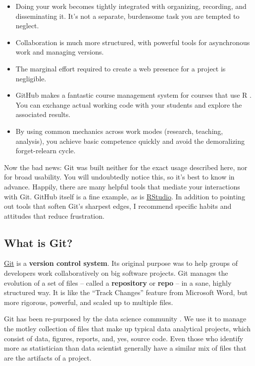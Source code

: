\documentclass[12pt]{article}
\providecommand{\tightlist}{%
  \setlength{\itemsep}{0pt}\setlength{\parskip}{0pt}}
\begin{document}
\begin{itemize}
\tightlist
\item
  Doing your work becomes tightly integrated with organizing, recording,
  and disseminating it. It's not a separate, burdensome task you are
  tempted to neglect.
\item
  Collaboration is much more structured, with powerful tools for
  asynchronous work and managing versions.
\item
  The marginal effort required to create a web presence for a project is
  negligible.
\item
  GitHub makes a fantastic course management system for courses that use
  R \citep{R}. You can exchange actual working code with your students
  and explore the associated results.
\item
  By using common mechanics across work modes (research, teaching,
  analysis), you achieve basic competence quickly and avoid the
  demoralizing forget-relearn cycle.
\end{itemize}

Now the bad news: Git was built neither for the exact usage described
here, nor for broad usability. You will undoubtedly notice this, so it's
best to know in advance. Happily, there are many helpful tools that
mediate your interactions with Git. GitHub itself is a fine example, as
is \href{https://www.rstudio.com/products/rstudio/}{RStudio}. In
addition to pointing out tools that soften Git's sharpest edges, I
recommend specific habits and attitudes that reduce frustration.

\subsection{What is Git?}\label{what-is-git}

\href{http://git-scm.com}{Git} is a \textbf{version control system}. Its
original purpose was to help groups of developers work collaboratively
on big software projects. Git manages the evolution of a set of files --
called a \textbf{repository} or \textbf{repo} -- in a sane, highly
structured way. It is like the ``Track Changes'' feature from Microsoft
Word, but more rigorous, powerful, and scaled up to multiple files.

Git has been re-purposed by the data science community
\citep{Ram2013, git-for-humans, ten-simple-rules-git}. We use it to
manage the motley collection of files that make up typical data
analytical projects, which consist of data, figures, reports, and, yes,
source code. Even those who identify more as statistician than data
scientist generally have a similar mix of files that are the artifacts
of a project.
\end{document}
